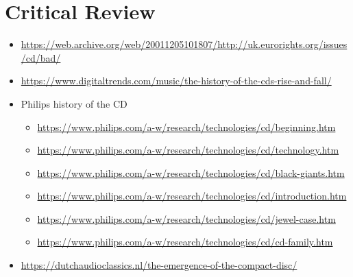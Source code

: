 \section{Critical Review}
\captionsetup[figure]{font=small,labelfont=bf}
\lipsum[4]


\begin{itemize}
    \item \url{https://web.archive.org/web/20011205101807/http://uk.eurorights.org/issues/cd/bad/}
    \item \url{https://www.digitaltrends.com/music/the-history-of-the-cds-rise-and-fall/}
    \item Philips history of the CD \begin{itemize}
        \item \url{https://www.philips.com/a-w/research/technologies/cd/beginning.htm}
        \item \url{https://www.philips.com/a-w/research/technologies/cd/technology.htm}
        \item \url{https://www.philips.com/a-w/research/technologies/cd/black-giants.htm}
        \item \url{https://www.philips.com/a-w/research/technologies/cd/introduction.htm}
        \item \url{https://www.philips.com/a-w/research/technologies/cd/jewel-case.htm}
        \item \url{https://www.philips.com/a-w/research/technologies/cd/cd-family.htm}
    \end{itemize}
    \item \url{https://dutchaudioclassics.nl/the-emergence-of-the-compact-disc/}
    
\end{itemize}
